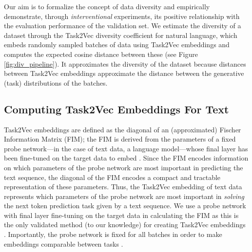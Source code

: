 \documentclass[10pt]{article} %
\begin{document}
Our aim is to formalize the concept of data diversity and empirically demonstrate, through \textit{interventional} experiments, its positive relationship with the evaluation performance of the validation set.  
We estimate the diversity of a dataset through the Task2Vec diversity coefficient for natural language, which embeds randomly sampled batches of data using Task2Vec embeddings \citep{task2vec} and computes the expected cosine distance between these (see Figure \ref{fig:div_pipeline}). 
It approximates the diversity of the dataset because distances between Task2Vec embeddings approximate the distance between the generative (task) distributions of the batches. 

\subsection{Computing Task2Vec Embeddings For Text}
\label{body:computing_task2vec}
Task2Vec embeddings are defined as the diagonal of an (approximated) Fischer Information Matrix (FIM); the FIM is derived from the parameters of a fixed probe network---in the case of text data, a language model---whose final layer has been fine-tuned on the target data to embed \citep{task2vec}. 
Since the FIM encodes information on which parameters of the probe network are most important in predicting the text sequence, the diagonal of the FIM encodes a compact and tractable representation of these parameters. 
Thus, the Task2Vec embedding of text data represents which parameters of the probe network are most important in \textit{solving} the next token prediction task given by a text sequence. 
We use a probe network with final layer fine-tuning on the target data in calculating the FIM as this is the only validated method (to our knowledge) for creating Task2Vec embeddings \citep{task2vec}. 
Importantly, the probe network is fixed for all batches in order to make embeddings comparable between tasks \citep{task2vec}.
\end{document}
